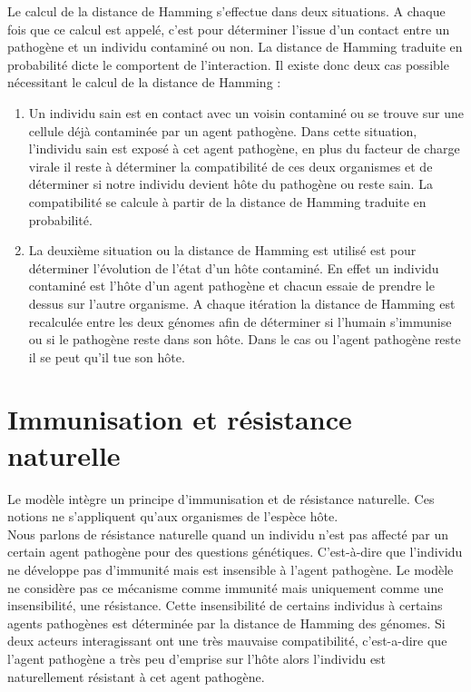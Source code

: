 Le calcul de la distance de Hamming s'effectue dans deux situations. A chaque fois que ce calcul est appelé, c'est pour déterminer l'issue d'un contact entre un pathogène et un individu contaminé ou non. La distance de Hamming traduite en probabilité dicte le comportent de l’interaction. Il existe donc deux cas possible nécessitant le calcul de la distance de Hamming :\\

\begin{enumerate}
    \item Un individu sain est en contact avec un voisin contaminé ou se trouve sur une cellule déjà contaminée par un agent pathogène. Dans cette situation, l'individu sain est exposé à cet agent pathogène, en plus du facteur de charge virale il reste à déterminer la compatibilité de ces deux organismes et de déterminer si notre individu devient hôte du pathogène ou reste sain. La compatibilité se calcule à partir de la distance de Hamming traduite en probabilité.
    \item La deuxième situation ou la distance de Hamming est utilisé est pour déterminer l'évolution de l'état d'un hôte contaminé. En effet un individu contaminé est l'hôte d'un agent pathogène et chacun essaie de prendre le dessus sur l'autre organisme. A chaque itération la distance de Hamming est recalculée entre les deux génomes afin de déterminer si l'humain s'immunise ou si le pathogène reste dans son hôte. Dans le cas ou l'agent pathogène reste il se peut qu'il tue son hôte.
\end{enumerate}

\section{Immunisation et résistance naturelle}

Le modèle intègre un principe d'immunisation et de résistance naturelle. Ces notions ne s'appliquent qu'aux organismes de l'espèce hôte.\\

Nous parlons de résistance naturelle quand un individu n'est pas affecté par un certain agent pathogène pour des questions génétiques. C'est-à-dire que l'individu ne développe pas d'immunité mais est insensible à l'agent pathogène. Le modèle ne considère pas ce mécanisme comme immunité mais uniquement comme une insensibilité, une résistance. Cette insensibilité de certains individus à certains agents pathogènes est déterminée par la distance de Hamming des génomes. Si deux acteurs interagissant ont une très mauvaise compatibilité, c'est-a-dire que l'agent pathogène a très peu d'emprise sur l'hôte alors l'individu est naturellement résistant à cet agent pathogène.\\

